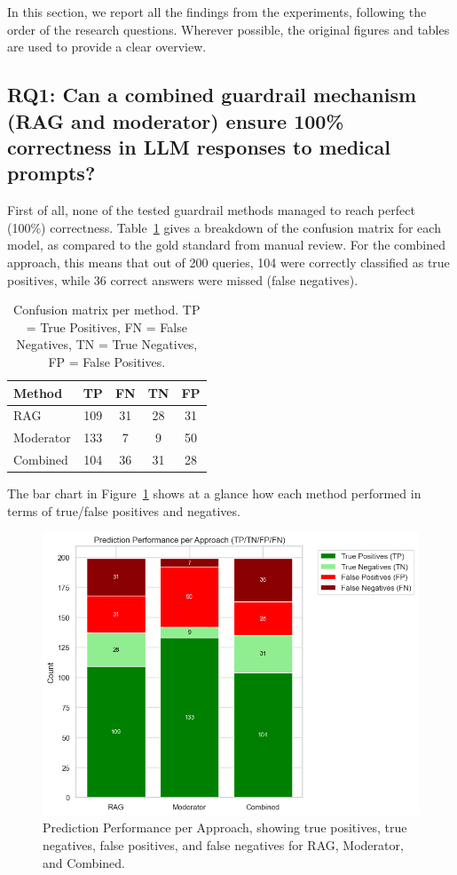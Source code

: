 In this section, we report all the findings from the experiments, following the order of the research questions. Wherever possible, the original figures and tables are used to provide a clear overview.

\subsection{RQ1: Can a combined guardrail mechanism (RAG and moderator) ensure 100\% correctness in LLM responses to medical prompts?}

First of all, none of the tested guardrail methods managed to reach perfect (100\%) correctness. Table~\ref{tab:confusionmatrix} gives a breakdown of the confusion matrix for each model, as compared to the gold standard from manual review. For the combined approach, this means that out of 200 queries, 104 were correctly classified as true positives, while 36 correct answers were missed (false negatives).

\begin{table}[H]
\centering
\caption{Confusion matrix per method. TP = True Positives, FN = False Negatives, TN = True Negatives, FP = False Positives.}
\label{tab:confusionmatrix}
\begin{tabular}{lcccc}
\toprule
Method & TP & FN & TN & FP \\
\midrule
RAG        & 109 & 31 & 28 & 31 \\
Moderator  & 133 & 7  & 9  & 50 \\
Combined   & 104 & 36 & 31 & 28 \\
\bottomrule
\end{tabular}
\end{table}

The bar chart in Figure~\ref{fig:prediction_performance_bar} shows at a glance how each method performed in terms of true/false positives and negatives.

\begin{figure}[H]
  \centering
  \includegraphics[width=0.95\linewidth]{figures/prediction_performance_per_approach.png}
  \caption{Prediction Performance per Approach, showing true positives, true negatives, false positives, and false negatives for RAG, Moderator, and Combined.}
  \label{fig:prediction_performance_bar}
\end{figure}

